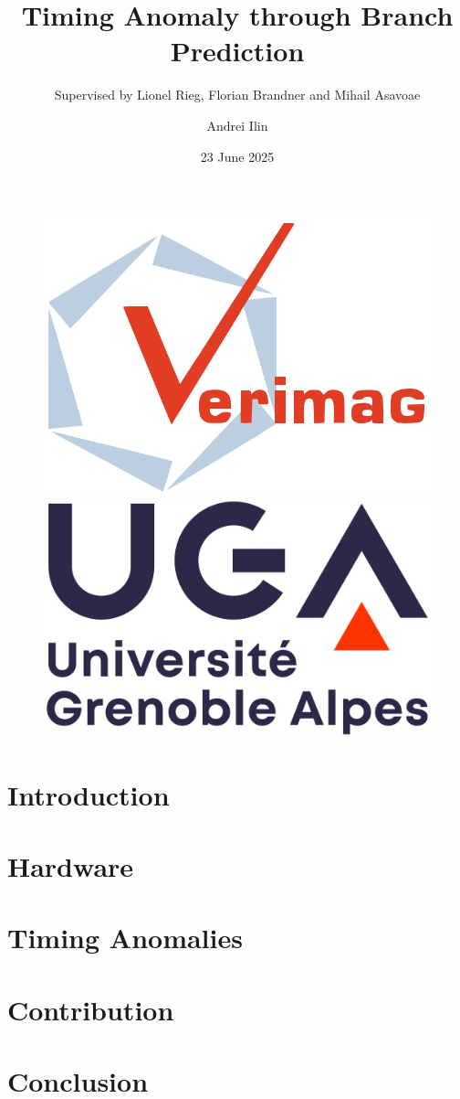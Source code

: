 \documentclass{beamer}
\author{Andrei Ilin}
\title{Timing Anomaly through Branch Prediction}
\subtitle{Supervised by Lionel Rieg, Florian Brandner and Mihail Asavoae}
\institute{Université Grenoble Alpes}
\date{23 June 2025}
\begin{document}
\renewcommand{\figurename}{Fig.}

\begin{frame}
    \titlepage
    \begin{figure}[htpb]
        \begin{center}
            \includegraphics[width=0.2\linewidth]{pic/logo-verimag.png}
            \includegraphics[width=0.2\linewidth]{pic/logo-uga.png}
        \end{center}
    \end{figure}
\end{frame}

\begin{frame}
    \tableofcontents[sectionstyle=show,subsectionstyle=show/shaded/hide,subsubsectionstyle=show/shaded/hide]
\end{frame}

\section{Introduction}

\section{Hardware}

\section{Timing Anomalies}

\section{Contribution}

\section{Conclusion}
\end{document}
